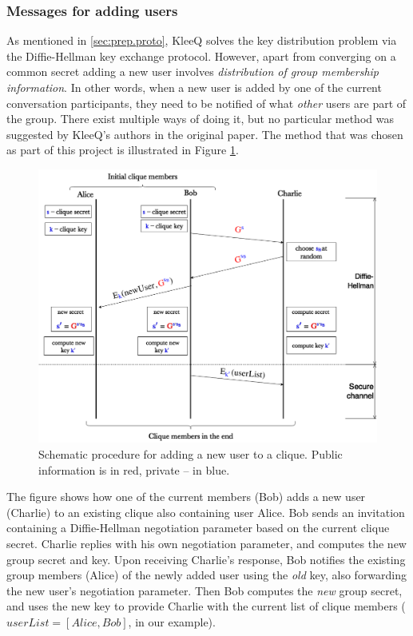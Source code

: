 \documentclass[a4paper, 12pt]{report}
\begin{document}
\subsubsection{Messages for adding users}
As mentioned in \cref{sec:prep.proto}, KleeQ solves the key distribution problem via the Diffie-Hellman key exchange protocol. However, apart from converging on a common secret adding a new user involves \emph{distribution of group membership information}. In other words, when a new user is added by one of the current conversation participants, they need to be notified of what \emph{other} users are part of the group. There exist multiple ways of doing it, but no particular method was suggested by KleeQ's authors in the original paper. The method that was chosen as part of this project is illustrated in Figure \ref{fig:CliqueFormation}.
\begin{figure}[H]
    \captionsetup{width=0.76\textwidth}
    \centering
    \includegraphics[width=0.76\linewidth]{pics/CliqueFormation.png}
    \caption{\label{fig:CliqueFormation} Schematic procedure for adding a new user to a clique. Public information is in {\color{red} red}, private -- in {\color{blue} blue}.}
\end{figure}
The figure shows how one of the current members (Bob) adds a new user (Charlie) to an existing clique also containing user Alice. Bob sends an invitation containing a Diffie-Hellman negotiation parameter based on the current clique secret. Charlie replies with his own negotiation parameter, and computes the new group secret and key. Upon receiving Charlie's response, Bob notifies the existing group members (Alice) of the newly added user using the \emph{old} key, also forwarding the new user's negotiation parameter. Then Bob computes the \emph{new} group secret, and uses the new key to provide Charlie with the current list of clique members ($userList = [Alice, Bob]$, in our example). \\
\end{document}
